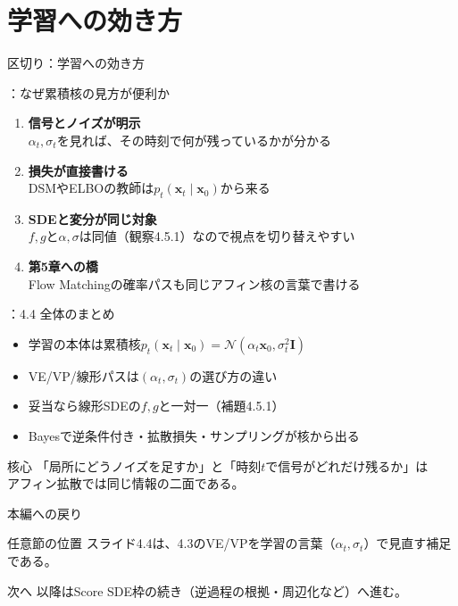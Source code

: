 \section{学習への効き方}
\assuppl
\begin{frame}{区切り：\supplmark\;学習への効き方}
    \tableofcontents[currentsection]
\end{frame}
\assuppl
\begin{frame}{\supplmark：なぜ累積核の見方が便利か}
    \begin{enumerate}
        \item \textbf{信号とノイズが明示}\\
        $\alpha_t,\sigma_t$を見れば、その時刻で何が残っているかが分かる
        \item \textbf{損失が直接書ける}\\
        DSMやELBOの教師は$p_t(\bm{x}_t\mid\bm{x}_0)$から来る
        \item \textbf{SDEと変分が同じ対象}\\
        $f,g$と$\alpha,\sigma$は同値（観察4.5.1）なので視点を切り替えやすい
        \item \textbf{第5章への橋}\\
        Flow Matchingの確率パスも同じアフィン核の言葉で書ける
    \end{enumerate}
\end{frame}
\assuppl
\begin{frame}{\supplmark：4.4 全体のまとめ}
    \begin{itemize}
        \item 学習の本体は累積核$p_t(\bm{x}_t\mid\bm{x}_0)=\mathcal{N}(\alpha_t\bm{x}_0,\sigma_t^{2}\bm{I})$
        \item VE/VP/線形パスは$(\alpha_t,\sigma_t)$の選び方の違い
        \item 妥当なら線形SDEの$f,g$と一対一（補題4.5.1）
        \item Bayesで逆条件付き・拡散損失・サンプリングが核から出る
    \end{itemize}
    \begin{exampleblock}{核心}
        「局所にどうノイズを足すか」と「時刻$t$で信号がどれだけ残るか」は\\
        アフィン拡散では同じ情報の二面である。
    \end{exampleblock}
\end{frame}
\asmain
\begin{frame}{本編への戻り}
    \begin{block}{任意節の位置}
        スライド4.4は、4.3のVE/VPを学習の言葉（$\alpha_t,\sigma_t$）で見直す補足である。
    \end{block}
    \begin{block}{次へ}
        以降はScore SDE枠の続き（逆過程の根拠・周辺化など）へ進む。
    \end{block}
\end{frame}
